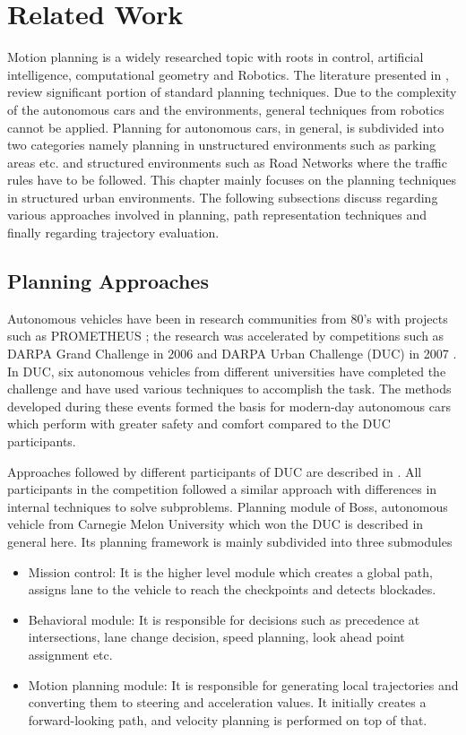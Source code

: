 \chapter{Related Work}
\label{related_work}
Motion planning is a widely researched topic with roots in control, artificial intelligence, computational geometry and Robotics. The literature presented in \cite{book_robot_motion_planning}, \cite{book_lavelle_planning} review significant portion of standard planning techniques. Due to the complexity of the autonomous cars and the environments, general techniques from robotics cannot be applied. Planning for autonomous cars, in general, is subdivided into two categories namely planning in unstructured environments such as parking areas etc. and structured environments such as Road Networks where the traffic rules have to be followed. This chapter mainly focuses on the planning techniques in structured urban environments. The following subsections discuss regarding various approaches involved in planning, path representation techniques and finally regarding trajectory evaluation. 

\section{Planning Approaches}
\label{planning_aproaches}

Autonomous vehicles have been in research communities from 80's with projects such as PROMETHEUS \cite{prometheus}; the research was accelerated by competitions such as DARPA Grand Challenge in 2006 and DARPA Urban Challenge (DUC) in 2007 \cite{darpa_urban_challenge}. In DUC, six autonomous vehicles from different universities have completed the challenge and have used various techniques to accomplish the task. The methods developed during these events formed the basis for modern-day autonomous cars which perform with greater safety and comfort compared to the DUC participants. 

Approaches followed by different participants of DUC are described in \cite{darpa_urban_challenge}. All participants in the competition followed a similar approach with differences in internal techniques to solve subproblems. Planning module of Boss, autonomous vehicle from Carnegie Melon University which won the DUC is described in general here. Its planning framework is mainly subdivided into three submodules 

\begin{itemize}
    \item Mission control: It is the higher level module which creates a global path, assigns lane to the vehicle to reach the checkpoints and detects blockades.
	\item Behavioral module: It is responsible for decisions such as precedence at intersections, lane change decision, speed planning, look ahead point assignment etc. 
	\item Motion planning module: It is responsible for generating local trajectories and converting them to steering and acceleration values. It initially creates a forward-looking path, and velocity planning is performed on top of that. 
\end{itemize}

